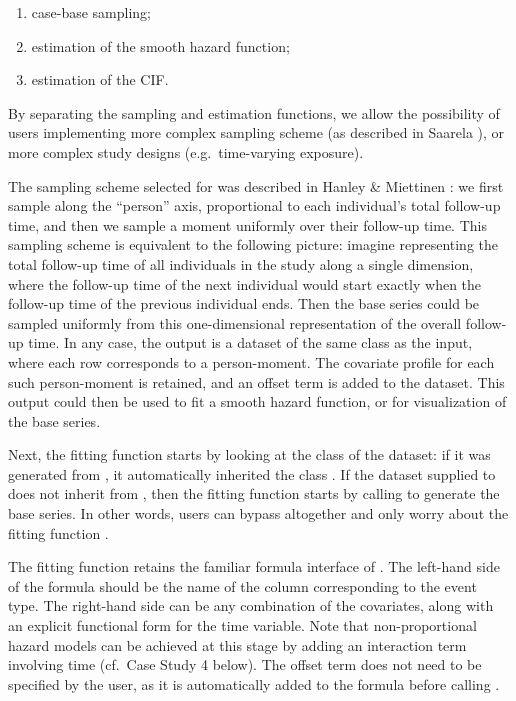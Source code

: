 \begin{enumerate}
\def\labelenumi{\arabic{enumi}.}
\tightlist
\item
  case-base sampling;
\item
  estimation of the smooth hazard function;
\item
  estimation of the CIF.
\end{enumerate}

By separating the sampling and estimation functions, we allow the
possibility of users implementing more complex sampling scheme (as
described in Saarela \citeyearpar{saarela2016case}), or more complex
study designs (e.g.~time-varying exposure).

The sampling scheme selected for  was described in
Hanley \& Miettinen \citeyearpar{hanley2009fitting}: we first sample
along the ``person'' axis, proportional to each individual's total
follow-up time, and then we sample a moment uniformly over their
follow-up time. This sampling scheme is equivalent to the following
picture: imagine representing the total follow-up time of all
individuals in the study along a single dimension, where the follow-up
time of the next individual would start exactly when the follow-up time
of the previous individual ends. Then the base series could be sampled
uniformly from this one-dimensional representation of the overall
follow-up time. In any case, the output is a dataset of the same class
as the input, where each row corresponds to a person-moment. The
covariate profile for each such person-moment is retained, and an offset
term is added to the dataset. This output could then be used to fit a
smooth hazard function, or for visualization of the base series.

Next, the fitting function  starts by looking at
the class of the dataset: if it was generated from
, it automatically inherited the class
. If the dataset supplied to  does
not inherit from , then the fitting function starts by
calling  to generate the base series. In other
words, users can bypass  altogether and only worry
about the fitting function .

The fitting function retains the familiar formula interface of
. The left-hand side of the formula should be the name of the
column corresponding to the event type. The right-hand side can be any
combination of the covariates, along with an explicit functional form
for the time variable. Note that non-proportional hazard models can be
achieved at this stage by adding an interaction term involving time
(cf.~Case Study 4 below). The offset term does not need to be specified
by the user, as it is automatically added to the formula before calling
.

